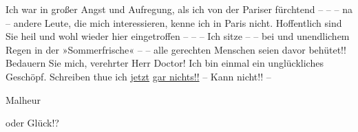\pstart
           Ich war in großer Angst und {\pb}Aufregung, als ich von der Pariser\label{K_L03695-4v}\label{K_L03695-4} fürchtend – – – na – andere Leute, die mich
               interessieren, kenne ich in Paris nicht.
               Hoffentlich sind Sie heil und wohl wieder hier eingetroffen – – – Ich sitze – – bei
                  \label{K_L03695-5v}\label{K_L03695-5} und unendlichem Regen in der »Sommerfrische« – – alle gerechten
               Menschen seien davor behütet!! Bedauern Sie mich, verehrter Herr Doctor! Ich bin
               einmal ein unglückliches Geschöpf. Schreiben thue ich \uline{jetzt}{ }\uline{gar nichts!!} – Kann nicht!! – \begin{otherlanguage}{french}Malheur\end{otherlanguage} oder
               Glück!?\pend
           
